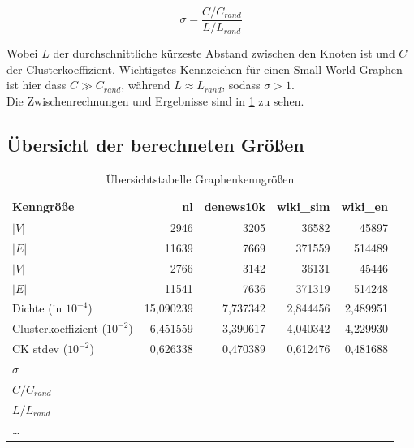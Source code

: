 \documentclass[11pt, a4paper]{article}
\begin{document}
$$
\sigma = \frac{C/C_{rand}}{ L/L_{rand}}
$$

Wobei $L$ der durchschnittliche kürzeste Abstand zwischen den Knoten ist und $C$
der Clusterkoeffizient. Wichtigstes Kennzeichen für einen Small-World-Graphen
ist hier dass $C \gg C_{rand}$, während $L \approx L_{rand}$, sodass $\sigma > 1$.\\
Die Zwischenrechnungen und Ergebnisse sind in \ref{tab-zsf} zu sehen.


\subsection{Übersicht der berechneten Größen}
\begin{table}[ht]
    \begin{tabular}{l*{4}{r}}
    \toprule
    Kenngröße & nl & denews10k & wiki\_sim & wiki\_en \\
    \midrule
    $|V|$                       & 2946      & 3205      & 36582     & 45897  \\
    $|E|$                       & 11639     & 7669      & 371559    & 514489 \\
    $|V|$\footnotemark[6]       & 2766      & 3142      & 36131     & 45446  \\
    $|E|$\footnotemark[6]       & 11541     & 7636      & 371319    & 514248 \\
    Dichte (in $10^{-4}$)       & 15,090239 & 7,737342  & 2,844456  & 2,489951 \\
    Clusterkoeffizient ($10^{-2}$) & 6,451559 & 3,390617 & 4,040342  & 4,229930 \\
    CK stdev ($10^{-2}$)        & 0,626338 & 0,470389 & 0,612476  & 0,481688 \\
    $\sigma$                    &           &           &           &         \\
    $C / C_{rand}$               &           &           &           &         \\
    $L / L_{rand}$               &           &           &           &         \\
    \dots                       &           &           &           &          \\
    \bottomrule
    \end{tabular}
    \caption{Übersichtstabelle Graphenkenngrößen}
    \label{tab-zsf}
\end{table}
\end{document}
